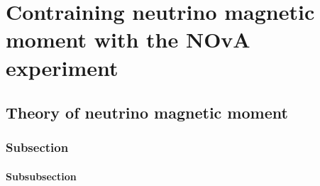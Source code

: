 \chapter{Contraining neutrino magnetic moment with the NOvA experiment}\label{chapterNeutrinoMagMomentNOvA}


\section{Theory of neutrino magnetic moment}

\subsection{Subsection}

\subsubsection{Subsubsection}